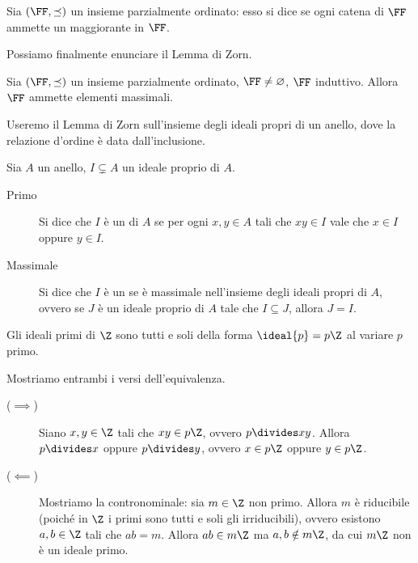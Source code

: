 \begin{definition}
    Sia $(\FF, \preceq)$ un insieme parzialmente ordinato: esso si dice  se ogni catena di $\FF$ ammette un maggiorante in $\FF$.
\end{definition}

Possiamo finalmente enunciare il Lemma di Zorn.
\begin{lemma} 
    \label{lem:Zorn}
    Sia $(\FF, \preceq)$ un insieme parzialmente ordinato, $\FF \neq \varnothing$, $\FF$ induttivo. Allora $\FF$ ammette elementi massimali.
\end{lemma}

Useremo il Lemma di Zorn sull'insieme degli ideali propri di un anello, dove la relazione d'ordine è data dall'inclusione.

\begin{definition}
    Sia $A$ un anello, $I \subsetneq A$ un ideale proprio di $A$. \begin{description}
        \item[Primo] Si dice che $I$ è un  di $A$ se per ogni $x, y \in A$ tali che $xy \in I$ vale che $x \in I$ oppure $y \in I$.
        \item[Massimale] Si dice che $I$ è un  se è massimale nell'insieme degli ideali propri di $A$, ovvero se $J$ è un ideale proprio di $A$ tale che $I \subseteq J$, allora $J = I$.
    \end{description}
\end{definition}

\begin{exercise}
    Gli ideali primi di $\Z$ sono tutti e soli della forma $\ideal{p} = p\Z$ al variare $p$ primo.
\end{exercise}
\begin{solution}
    Mostriamo entrambi i versi dell'equivalenza.
    \begin{description}
        \item[($\implies$)] Siano $x, y \in \Z$ tali che $xy \in p\Z$, ovvero $p \divides xy$. Allora $p \divides x$ oppure $p \divides y$, ovvero $x \in p\Z$ oppure $y \in p\Z$.
        \item[($\impliedby$)] Mostriamo la contronominale: sia $m \in \Z$ non primo. Allora $m$ è riducibile (poiché in $\Z$ i primi sono tutti e soli gli irriducibili), ovvero esistono $a, b \in \Z$ tali che $ab = m$. Allora $ab \in m\Z$ ma $a, b \notin m\Z$, da cui $m\Z$ non è un ideale primo. \qedhere
    \end{description}
\end{solution}

